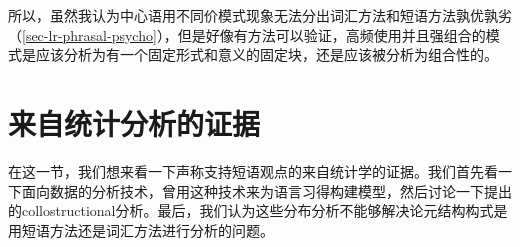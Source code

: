 \begin{exe}
\begin{xlist}[iv.]
\begin{exe}
\begin{xlist}[iv.]


所以，虽然我认为中心语用不同价模式现象无法分出词汇方法和短语方法孰优孰劣（\ref{sec-lr-phrasal-psycho}），但是好像有方法可以验证，高频使用并且强组合的模式是应该分析为有一个固定形式和意义的固定块，还是应该被分析为组合性的。

\section{来自统计分析的证据}
\label{stat-sec}

在这一节，我们想来看一下声称支持短语观点的来自统计学的证据。我们首先看一下面向数据的分析技术，\citet{Bod2009a}曾用这种技术来为语言习得构建模型，然后讨论一下\citet{SG2009a}提出的collostructional分析。最后，我们认为这些分布分析不能够解决论元结构构式是用短语方法还是词汇方法进行分析的问题。


\end{xlist}
\end{exe}
\end{xlist}
\end{exe}
